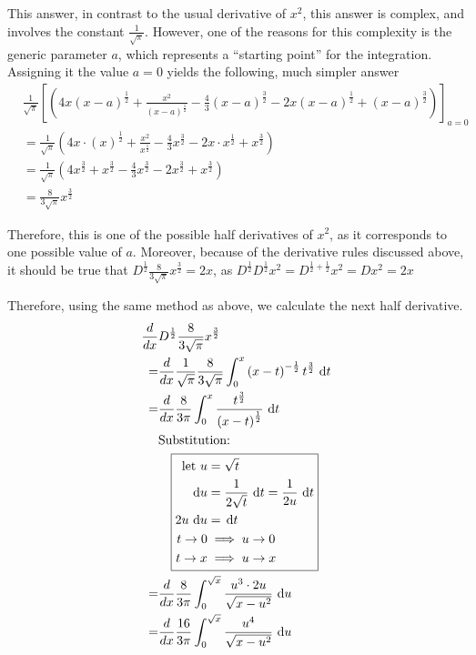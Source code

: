 \documentclass{article}
\DeclareMathOperator{\di}{\,d\!}
\newcommand*\Eval[3]{\left[#1\right]_{#2}^{#3}}
\newcommand{\IntSub}[1]{
{\textup{Substitution:}} \\
&\quad
\boxed{\begin{aligned}
		#1
\end{aligned}}
}
\begin{document}
This answer, in contrast to the usual derivative of $x^2$, this answer is
complex, and involves the constant $\frac{1}{\sqrt{\pi}}$. However, one of the
reasons for this complexity is the generic parameter $a$, which represents a
``starting point'' for the integration. Assigning it the value $a=0$ yields the following, much
simpler answer
\begin{align*}
	&\frac{1}{\sqrt{\pi}} \Eval{\left(4x\left(x-a\right)^\frac{1}{2} +
							   \frac{x^2}{\left(x-a\right)^\frac{1}{2}} -
							   \frac{4}{3}\left(x-a\right)^\frac{3}{2} -
							   2x\left(x-a\right)^\frac{1}{2} +
						       \left(x-a\right)^\frac{3}{2}\right)}
							   {a=0}{}\\
	&=\frac{1}{\sqrt{\pi}} \left(4x\cdot\left(x\right)^\frac{1}{2} +
							   \frac{x^2}{x^\frac{1}{2}} -
							   \frac{4}{3}x^\frac{3}{2} -
							   2x \cdot x^\frac{1}{2} +
						       x^\frac{3}{2}\right) \\
	&=\frac{1}{\sqrt{\pi}} \left(4x^\frac{3}{2} +
								 x^\frac{3}{2}-
							     \frac{4}{3}x^{\frac{3}{2}} -
								 2x^\frac{3}{2} +
						         x^\frac{3}{2}\right) \\
	&=\frac{8}{3\sqrt{\pi}} x^\frac{3}{2}
\end{align*}

Therefore, this is one of the possible half derivatives of $x^2$, as it
corresponds to one possible value of $a$. Moreover, because of the derivative rules
discussed above, it should be true that $D^\frac{1}{2}\frac{8}{3\sqrt{\pi}} x^\frac{3}{2} = 2x$,
as $D^\frac{1}{2}D^\frac{1}{2}x^2=D^{\frac{1}{2} + \frac{1}{2}} x^2=D x^2 = 2x$

Therefore, using the same method as above, we calculate the next half derivative.
\begin{align*}
	\frac{d}{dx}&D^\frac{1}{2} \frac{8}{3\sqrt{\pi}} x^\frac{3}{2} \\
	=&\frac{d}{dx}\frac{1}{\sqrt{\pi}} \frac{8}{3\sqrt{\pi}} \int_0^x \left(x-t\right)^{-\frac{1}{2}} t^\frac{3}{2} \di t \\
	=&\frac{d}{dx}\frac{8}{3\pi} \int_0^x \frac{t^\frac{3}{2}}{\left(x-t\right)^\frac{1}{2}} \di t \\
	 &\IntSub{
		 \text{let } u &= \sqrt{t} \\
		\di u &= \frac{1}{2\sqrt{t}} \di t = \frac{1}{2u} \di t \\
		2u \di u &= \di t \\
		t \to 0 &\implies u \to 0 \\
		t \to x &\implies u \to x
	} \\
	=&\frac{d}{dx}\frac{8}{3\pi} \int_0^{\sqrt{x}} \frac{u^3 \cdot 2u}{\sqrt{x-u^2}} \di u \\
	=&\frac{d}{dx}\frac{16}{3\pi} \int_0^{\sqrt{x}} \frac{u^4}{\sqrt{x-u^2}} \di u \\
\end{align*}
\end{document}
